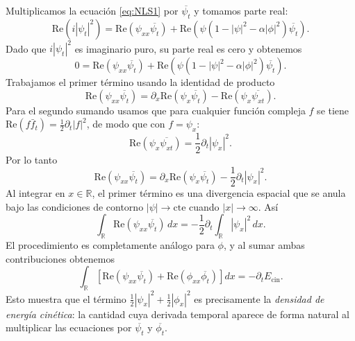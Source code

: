 \documentclass[letterpaper,11pt]{exam}
\theoremstyle{plain}
\begin{document}
Multiplicamos la ecuación \eqref{eq:NLS1} por $\overline{\psi_t}$ y tomamos parte real:
\begin{equation}
    \mathrm{Re}(i|\psi_t|^2) = \mathrm{Re}(\psi_{xx}\overline{\psi_t})
    + \mathrm{Re}\!\left(\psi(1 - |\psi|^2 - \alpha|\phi|^2)\overline{\psi_t}\right).
\end{equation}
Dado que $i|\psi_t|^2$ es imaginario puro, su parte real es cero y obtenemos
\begin{equation}
    0 = \mathrm{Re}(\psi_{xx}\overline{\psi_t})
    + \mathrm{Re}\!\left(\psi(1 - |\psi|^2 - \alpha|\phi|^2)\overline{\psi_t}\right).
\end{equation}
Trabajamos el primer término usando la identidad de producto
\begin{equation}
    \mathrm{Re}(\psi_{xx}\overline{\psi_t})
    = \partial_x \mathrm{Re}(\psi_x\overline{\psi_t}) - \mathrm{Re}(\psi_x\overline{\psi_{xt}}).
\end{equation}
Para el segundo sumando usamos que para cualquier función compleja $f$ se tiene
$\mathrm{Re}(f\bar{f}_t) = \frac{1}{2}\partial_t|f|^2$,
de modo que con $f = \psi_x$:
\begin{equation}
    \mathrm{Re}(\psi_x\overline{\psi_{xt}}) = \frac{1}{2}\partial_t|\psi_x|^2.
\end{equation}
Por lo tanto
\begin{equation}
    \mathrm{Re}(\psi_{xx}\overline{\psi_t})
    = \partial_x\mathrm{Re}(\psi_x\overline{\psi_t}) - \frac{1}{2}\partial_t|\psi_x|^2.
\end{equation}
Al integrar en $x \in \mathbb{R}$, el primer término es una divergencia espacial que se anula bajo las
condiciones de contorno $|\psi| \to \mathrm{cte}$ cuando $|x| \to \infty$. Así
\begin{equation}
    \int_{\mathbb{R}} \mathrm{Re}(\psi_{xx}\overline{\psi_t})\,dx
    = -\frac{1}{2}\partial_t\int_{\mathbb{R}}|\psi_x|^2\,dx.
\end{equation}
El procedimiento es completamente análogo para $\phi$, y al sumar ambas contribuciones obtenemos
\begin{equation}
    \int_{\mathbb{R}}\!\left[\mathrm{Re}(\psi_{xx}\overline{\psi_t})
    + \mathrm{Re}(\phi_{xx}\overline{\phi_t})\right]dx
    = -\partial_t E_{\mathrm{cin}}.
\end{equation}
Esto muestra que el término $\frac{1}{2}|\psi_x|^2 + \frac{1}{2}|\phi_x|^2$ es precisamente la
\emph{densidad de energía cinética}: la cantidad cuya derivada temporal aparece de forma natural
al multiplicar las ecuaciones por $\overline{\psi_t}$ y $\overline{\phi_t}$.
\end{document}

